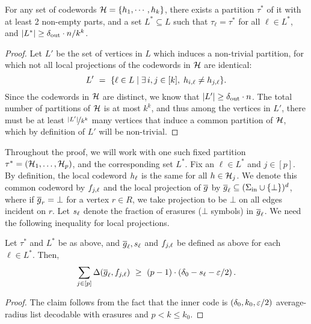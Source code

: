 \begin{claim}\label{lem:type_arg}
For any set of codewords $\calH = \inbraces{ h_1,\cdots , h_k}$, there exists a partition $\tau^*$
of it with at least 2 non-empty parts, and a set $L^*\subseteq L$ such that $\tau_{\ell} = \tau^*$
for all $\ell \in L^*$, and $|L^*| \geq \delta_\out \cdot n / {k^k}$.
\end{claim}
%	
\begin{proof}
%
Let $L'$ be the set of vertices in $L$ which induces a non-trivial partition, \ie for which not all local projections of the codewords in $\calH$ are identical:
\[
L' ~=~ \{\ell \in L \mid \exists\, i,j \in [k], \; \hil{i} \neq \hil{j} \}.
\]
%
Since the codewords in $\calH$ are distinct, we know that $|L'| \geq \delta_{\out} \cdot n$. 
%
The total number of partitions of $\calH$ is at most $k^k$, and thus among the vertices in $L'$, there must be at least $\nfrac{|L'|}{k^k}$ many vertices that induce a common partition of $\calH$, which by definition of $L'$ will be non-trivial.	
%
\end{proof}
	
	
Throughout the proof, we will work with one such fixed partition $\tau^* = (\calH_1, \ldots, \calH_p)$, and the corresponding set $L^*$. Fix an $\ell \in L^*$ and $j\in [p]$. 
%
By definition, the local codeword $\hl$ is the same for all $h\in \calH_j$. We denote this common codeword by $\fjl$ and the local projection of $\erase{g}$ by $\gl \subseteq (\Sigma_{\inn} \cup \{\bot\})^d$, where if $\erase{g}_r = \bot$ for a vertex $r \in R$, we take projection to be $\bot$ on all edges incident on $r$. 
%
Let $\sl$ denote the fraction of erasures ($\bot$ symbols) in $\gl$. We need the following inequality for local projections.
%
\begin{claim}\label{claim:local-bound}
Let $\tau^*$ and $L^*$ be as above, and  $\gl, \sl$ and $\fjl$ be defined as above for each $\ell \in L^*$. Then,
\[
\sum_{j\in [p]} \Delta(\gl, \fjl) ~\geq~ (p-1) \cdot (\delta_{0} - \sl - \eps/2) \mper
\]
\end{claim}
%
\begin{proof}
The claim follows from the fact that the inner code is $(\delta_0, k_0,\eps/2)$ average-radius list decodable with erasures and $p < k \leq k_0$.
\end{proof}

